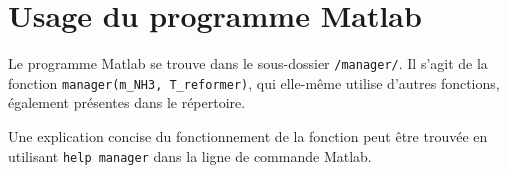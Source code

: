 \section{Usage du programme Matlab}

Le programme Matlab se trouve dans le sous-dossier \texttt{/manager/}. Il s'agit de la fonction \texttt{manager(m\_NH3, T\_reformer)}, qui elle-même utilise d'autres fonctions, également présentes dans le répertoire.

Une explication concise du fonctionnement de la fonction peut être trouvée en utilisant \texttt{help manager} dans la ligne de commande Matlab.
